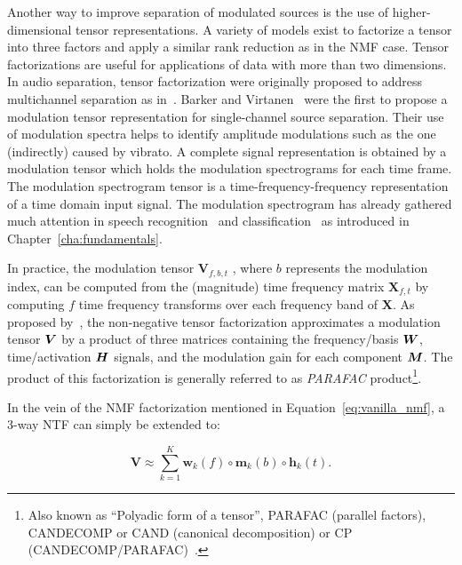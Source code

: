 
Another way to improve separation of modulated sources is the use of higher-dimensional tensor representations.
A variety of models exist to factorize a tensor into three factors and apply a similar rank reduction as in the NMF case.
Tensor factorizations are useful for applications of data with more than two dimensions.
In audio separation, tensor factorization were originally proposed to address multichannel separation as in~\cite{fitzgerald08, fevotte10, ozerov11}. 
Barker and Virtanen~\cite{barker13} were the first to propose a modulation tensor representation for single-channel source separation. 
Their use of modulation spectra helps to identify amplitude modulations such as the one (indirectly) caused by vibrato. 
A complete signal representation is obtained by a modulation tensor which holds the modulation spectrograms for each time frame.
The modulation spectrogram tensor is a time-frequency-frequency representation of a time domain input signal.
The modulation spectrogram has already gathered much attention in speech recognition~\cite{greenberg97, kingsbury98} and classification~\cite{kinnunen08, markaki09} as introduced in Chapter~\ref{cha:fundamentals}.
\par
In practice, the modulation tensor \(\mathbf{V}_{f, b, t}\) , where \(b\) represents the modulation index, can be computed from the (magnitude) time frequency matrix \(\mathbf{X}_{f, t}\) by computing \(f\) time frequency transforms over each frequency band of \(\mathbf{X}\).
As proposed by~\cite{barker13}, the non-negative tensor factorization approximates a modulation tensor \({\bm{V}}\) by a product of three matrices containing the frequency/basis \({\bm{W}}\), time/activation \({\bm{H}}\) signals, and the modulation gain for each component \({\bm{M}}\).
The product of this factorization is generally referred to as \emph{PARAFAC} product\footnote{Also known as ``Polyadic form of a tensor'', PARAFAC (parallel factors), CANDECOMP or CAND (canonical decomposition) or CP (CANDECOMP/PARAFAC)~\cite{kolda09}.}.

In the vein of the NMF factorization mentioned in Equation~\ref{eq:vanilla_nmf}, a 3-way NTF can simply be extended to:

\begin{equation}
   \mathbf{V} \approx \sum\limits_{k=1}^{K} \mathbf{w}_{k}(f) \circ \mathbf{m}_{k}(b) \circ \mathbf{h}_{k}(t).
\end{equation}

